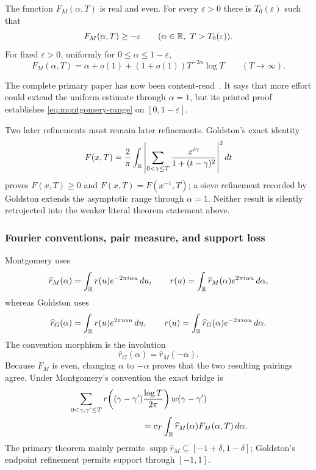 \begin{theorem}
\cite[pp.~181 and~187--191, eqs.~(2) and~(18)--(34)]{montgomery1973}
The function $F_M(\alpha,T)$ is real and even.  For every $\varepsilon>0$ there is
$T_0(\varepsilon)$ such that
\[
 F_M(\alpha,T)\geq-\varepsilon
 \qquad(\alpha\in\mathbb R,\ T>T_0(\varepsilon)).
\]
For fixed $\varepsilon>0$, uniformly for $0\leq\alpha\leq1-\varepsilon$,
\begin{equation}
 F_M(\alpha,T)=\alpha+o(1)+(1+o(1))T^{-2\alpha}\log T
 \qquad(T\to\infty).
 \label{eq:montgomery-range}
\end{equation}
\end{theorem}

The complete primary paper has now been content-read~\cite{montgomery1973}.  It says that
more effort could extend the uniform estimate through
$\alpha=1$, but its printed proof establishes \eqref{eq:montgomery-range} on
$[0,1-\varepsilon]$.

Two later refinements must remain later refinements.  Goldston's exact identity
\cite[eqs.~(4.1)--(4.11)]{goldston2004}
\begin{equation}
 F(x,T)=\frac2\pi\int_\mathbb R
 \left|\sum_{0<\gamma\leq T}
 \frac{x^{i\gamma}}{1+(t-\gamma)^2}\right|^2dt
 \label{eq:goldston-positive-square}
\end{equation}
proves $F(x,T)\geq0$ and $F(x,T)=F(x^{-1},T)$; a sieve refinement recorded by
Goldston extends the asymptotic range through $\alpha=1$.  Neither result is silently
retrojected into the weaker literal theorem statement above.

\subsubsection{Fourier conventions, pair measure, and support loss}

Montgomery uses~\cite[pp.~181--182, eqs.~(3)--(6)]{montgomery1973}
\[
 \widehat r_M(\alpha)=\int_\mathbb R r(u)e^{-2\pi i\alpha u}\,du,
 \qquad
 r(u)=\int_\mathbb R\widehat r_M(\alpha)e^{2\pi i\alpha u}\,d\alpha,
\]
whereas Goldston uses~\cite[Sec.~5]{goldston2004}
\[
 \widehat r_G(\alpha)=\int_\mathbb R r(u)e^{2\pi i\alpha u}\,du,
 \qquad
 r(u)=\int_\mathbb R\widehat r_G(\alpha)e^{-2\pi i\alpha u}\,d\alpha.
\]
The convention morphism is the involution
\begin{equation}
 \widehat r_G(\alpha)=\widehat r_M(-\alpha).
 \label{eq:fourier-sign-reflection}
\end{equation}
Because $F_M$ is even, changing $\alpha$ to $-\alpha$ proves that the two resulting
pairings agree.  Under Montgomery's convention the exact bridge is
\begin{align}
 &\sum_{0<\gamma,\gamma'\leq T}
 r\!\left((\gamma-\gamma')\frac{\log T}{2\pi}\right)w(\gamma-\gamma') \notag\\
 &\hspace{30mm}=c_T
 \int_\R\widehat r_M(\alpha)F_M(\alpha,T)\,d\alpha.
 \label{eq:test-pair-bridge}
\end{align}
The primary theorem mainly permits
$\operatorname{supp}\widehat r_M\subseteq[-1+\delta,1-\delta]$; Goldston's endpoint
refinement permits support through $[-1,1]$.


